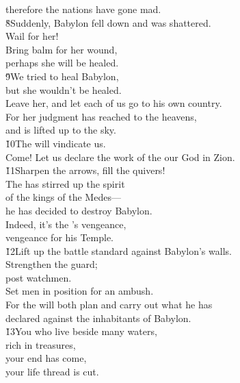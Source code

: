\begin{poetry}
\poemll    therefore the nations have gone mad. \\
\poeml \v{8}Suddenly, Babylon fell down and was shattered. \\
\poemll    Wail for her! \\
\poeml Bring balm for her wound, \\
\poemll    perhaps she will be healed. \\
\poeml \v{9}We tried to heal Babylon, \\
\poemll    but she wouldn't be healed. \\
\poeml Leave her, and let each of us go to his own country. \\
\poemll    For her judgment has reached to the heavens, \\
\poemlll       and is lifted up to the sky. \\
\poeml \v{10}The  will vindicate us. \\
\poemll    Come! Let us declare the work of the  our God in Zion. \\
\poeml \v{11}Sharpen the arrows, fill the quivers! \\
\poeml The  has stirred up the spirit \\
\poemll    of the kings of the Medes--- \\
\poemlll       he has decided to destroy Babylon. \\
\poeml Indeed, it's the 's vengeance, \\
\poemll    vengeance for his Temple. \\
\poeml \v{12}Lift up the battle standard against Babylon's walls. \\
\poemll    Strengthen the guard; \\
\poemlll       post watchmen. \\
\poeml Set men in position for an ambush. \\
\poemll    For the  will both plan and carry out what he has \\
\poemlll       declared against the inhabitants of Babylon. \\
\poeml \v{13}You who live beside many waters, \\
\poemll    rich in treasures, \\
\poeml your end has come, \\
\poemll    your life thread is cut. \\

\end{poetry}
